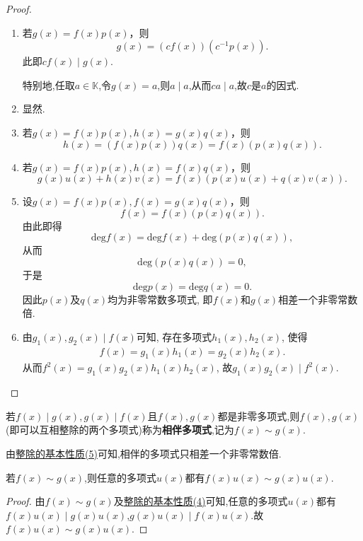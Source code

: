 \documentclass[../../main.tex]{subfiles}
\begin{document}
\begin{proof}
\begin{enumerate}[(1)]
\item 若\(g(x)=f(x)p(x)\)，则
\[
g(x)=(cf(x))(c^{-1}p(x)).
\]
此即\(cf(x)\mid g(x)\).

特别地,任取$a\in \mathbb{K}$,令$g(x)=a$,则$a\mid a$,从而$ca \mid a$,故$c$是$a$的因式.

\item 显然.

\item 若\(g(x)=f(x)p(x),h(x)=g(x)q(x)\)，则
\[
h(x)=(f(x)p(x))q(x)=f(x)(p(x)q(x)).
\]

\item 若\(g(x)=f(x)p(x),h(x)=f(x)q(x)\)，则
\[
g(x)u(x)+h(x)v(x)=f(x)(p(x)u(x)+q(x)v(x)).
\]

\item 设\(g(x)=f(x)p(x),f(x)=g(x)q(x)\)，则
\[
f(x)=f(x)(p(x)q(x)).
\]
由此即得
\[
\mathrm{deg }f(x)=\mathrm{deg }f(x)+\mathrm{deg}(p(x)q(x)),
\]
从而
\[
\mathrm{deg}(p(x)q(x)) = 0,
\]
于是
\[
\mathrm{deg }p(x)=\mathrm{deg }q(x)=0.
\]
因此\(p(x)\)及\(q(x)\)均为非零常数多项式, 即\(f(x)\)和\(g(x)\)相差一个非零常数倍.

\item 由\(g_1(x),g_2(x)\mid f(x)\)可知, 存在多项式\(h_1(x),h_2(x)\), 使得
\begin{align*}
f(x) = g_1(x)h_1(x) = g_2(x)h_2(x).
\end{align*}
从而\(f^2(x) = g_1(x)g_2(x)h_1(x)h_2(x)\), 故\(g_1(x)g_2(x)\mid f^2(x)\). 
\end{enumerate}
\end{proof}

\begin{definition}[相伴多项式]\label{definition:}
若\(f(x)\mid g(x),g(x)\mid f(x)\)且\(f(x),g(x)\)都是非零多项式,则$f(x),g(x)$(即可以互相整除的两个多项式)称为\textbf{相伴多项式},记为\(f(x)\sim g(x)\).
\end{definition}
\begin{note}
由\hyperref[proposition:整除的基本性质]{整除的基本性质(5)}可知,相伴的多项式只相差一个非零常数倍.
\end{note}

\begin{proposition}[相伴多项式的基本性质]\label{proposition:相伴多项式的基本性质}
若$f(x)\sim g(x)$,则任意的多项式$u(x)$都有$f(x)u(x)\sim g(x)u(x)$.
\end{proposition}
\begin{proof}
由$f(x)\sim g(x)$及\hyperref[proposition:整除的基本性质]{整除的基本性质(4)}可知,任意的多项式$u(x)$都有$f(x)u(x)\mid g(x)u(x)$,$g(x)u(x)\mid f(x)u(x)$.故$f(x)u(x)\sim g(x)u(x)$.
\end{proof}
\end{document}
